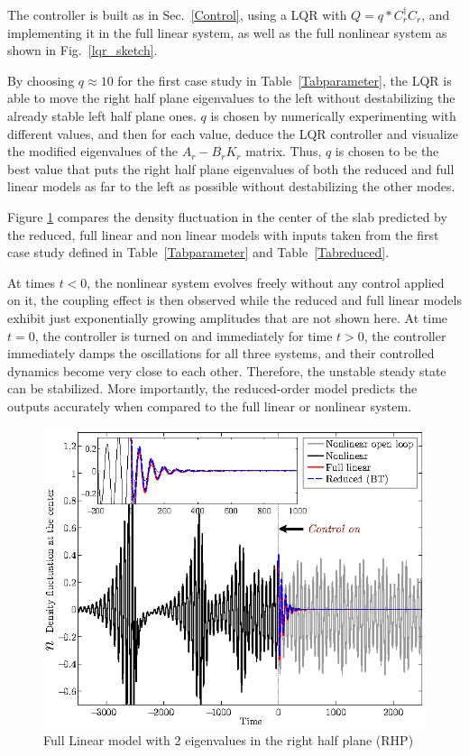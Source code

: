 \documentclass[12pt,lot, lof]{puthesis}
\begin{document}
The controller is built as in Sec.~\ref{Control}, using a LQR with $Q =  q * C^\dagger_r C_r$, and implementing it in the full linear system, as well as the full nonlinear system as shown in Fig.~\ref{lqr_sketch}.

By choosing $q \approx 10$ for the first case study in Table~\ref{Tabparameter}, the LQR is able to move the right half plane eigenvalues to the left without destabilizing the already stable left half plane ones. $q$ is chosen by numerically experimenting with different values, and then for each value, deduce the LQR controller and visualize the modified eigenvalues of the $ A_r-B_r K_r $ matrix. Thus, $q$ is chosen to be the best value that puts the right half plane eigenvalues of both the reduced and full linear models as far to the left as possible without destabilizing the other modes.

Figure \ref{lqr1} compares the density fluctuation in the center of the slab predicted by the reduced, full linear and non linear models  with inputs taken from the first case study defined in Table~\ref{Tabparameter} and Table~\ref{Tabreduced}. 

 At times $t<0$, the nonlinear system evolves freely without any control applied on it, the coupling effect is then observed while the reduced and full linear models exhibit just exponentially growing amplitudes that are not shown here. At time $t=0$, the controller is turned on and immediately for time $t>0$, the controller immediately damps the oscillations for all three systems, and their controlled dynamics become very close to each other. Therefore, the unstable steady state can be stabilized. More importantly, the reduced-order model predicts the outputs accurately when compared to the full linear or nonlinear system.


\begin{figure}[htb]
\centering
  \includegraphics[width=0.7 \linewidth]{fullstate1}
  \caption{Full Linear model with 2 eigenvalues in the right half plane (RHP)}
  \label{lqr1}
\end{figure}
\end{document}
